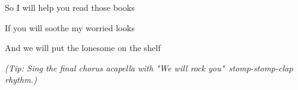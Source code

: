 \begin{song}
\bigskip

So I will help you read those books \par
If you will soothe my worried looks \par
And we will put the lonesome on the shelf \par

\bigskip

\Chorus {}

\bigskip
\bigskip

\textit{\smaller
(Tip: Sing the final chorus acapella with "We will rock you"\ stomp-stomp-clap rhythm.)
}

\end{song}
